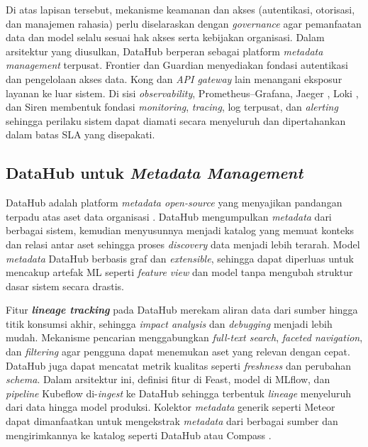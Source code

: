 Di atas lapisan tersebut, mekanisme keamanan dan akses (autentikasi, otorisasi, dan manajemen rahasia) perlu diselaraskan dengan \textit{governance} agar pemanfaatan data dan model selalu sesuai hak akses serta kebijakan organisasi. Dalam arsitektur yang diusulkan, DataHub berperan sebagai platform \textit{metadata management} terpusat. Frontier \autocite{raystack2025frontier} dan Guardian \autocite{raystack2025guardian} menyediakan fondasi autentikasi dan pengelolaan akses data. Kong \autocite{kong2025} dan \textit{API gateway} lain menangani eksposur layanan ke luar sistem. Di sisi \textit{observability}, Prometheus--Grafana, Jaeger \autocite{jaeger2024}, Loki \autocite{loki2024}, dan Siren \autocite{raystack2025siren} membentuk fondasi \textit{monitoring}, \textit{tracing}, log terpusat, dan \textit{alerting} sehingga perilaku sistem dapat diamati secara menyeluruh dan dipertahankan dalam batas SLA yang disepakati.

\subsection{DataHub untuk \textit{Metadata Management}}
\label{sec:datahub}

DataHub adalah platform \textit{metadata open-source} yang menyajikan pandangan terpadu atas aset data organisasi \autocite{datahub2024}. DataHub mengumpulkan \textit{metadata} dari berbagai sistem, kemudian menyusunnya menjadi katalog yang memuat konteks dan relasi antar aset sehingga proses \textit{discovery} data menjadi lebih terarah. Model \textit{metadata} DataHub berbasis graf dan \textit{extensible}, sehingga dapat diperluas untuk mencakup artefak ML seperti \textit{feature view} dan model tanpa mengubah struktur dasar sistem secara drastis.

Fitur \textbf{\textit{lineage tracking}} pada DataHub merekam aliran data dari sumber hingga titik konsumsi akhir, sehingga \textit{impact analysis} dan \textit{debugging} menjadi lebih mudah. Mekanisme pencarian menggabungkan \textit{full-text search}, \textit{faceted navigation}, dan \textit{filtering} agar pengguna dapat menemukan aset yang relevan dengan cepat. DataHub juga dapat mencatat metrik kualitas seperti \textit{freshness} dan perubahan \textit{schema}. Dalam arsitektur ini, definisi fitur di Feast, model di MLflow, dan \textit{pipeline} Kubeflow di-\textit{ingest} ke DataHub sehingga terbentuk \textit{lineage} menyeluruh dari data hingga model produksi. Kolektor \textit{metadata} generik seperti Meteor \autocite{raystack2025meteor} dapat dimanfaatkan untuk mengekstrak \textit{metadata} dari berbagai sumber dan mengirimkannya ke katalog seperti DataHub atau Compass \autocite{raystack2025compass}.

